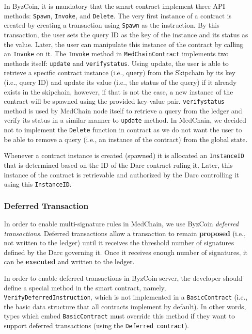 In ByzCoin, it is mandatory that the smart contract implement three API methods: \texttt{Spawn}, \texttt{Invoke}, and \texttt{Delete}. The very first instance of a contract is created by creating a transaction using \texttt{Spawn} as the instruction. By this transaction, the user sets the query ID as the key of the instance and its status as the value. Later, the user can manipulate this instance of the contract by calling an \texttt{Invoke} on it. The \texttt{Invoke} method in \texttt{MedChainContract} implements two methods itself: \texttt{update} and \texttt{verifystatus}. Using update, the user is able to retrieve a specific contract instance (i.e., query) from the Skipchain by its key (i.e., query ID) and update its value (i.e., the status of the query) if it already exists in the skipchain, however, if that is not the case, a new instance of the contract will be spawned using the provided key-value pair. \texttt{verifystatus} method is used by MedChain node itself to retrieve a query from the ledger and verify its status in a similar manner to \texttt{update} method. In MedChain, we decided not to implement the \texttt{Delete} function in contract as we do not want the user to be able to remove a query (i.e., an instance of the contract) from the global state. 

Whenever a contract instance is created (spawned) it is allocated an \texttt{InstanceID} that is determined based on the ID of the Darc contract ruling it. Later, this instance of the contract is retrievable and authorized by the Darc controlling it using this \texttt{InstanceID}.

\subsubsection{Deferred Transaction}
In order to enable multi-signature rules in MedChain, we use ByzCoin \textit{deferred transactions}. Deferred transactions allow a transaction to remain \textbf{proposed} (i.e., not written to the ledger) until it receives the threshold number of signatures defined by the Darc governing it. Once it receives enough number of signatures, it can be \textbf{executed} and written to the ledger. 

In order to enable deferred transactions in ByzCoin server, the developer should define a special method in the smart contract, namely, \texttt{VerifyDeferredInstruction}, which is not implemented in a \texttt{BasicContract} (i.e., the basic data structure that all contracts implement by default). In other words, types which embed \texttt{BasicContract} must override this method if they want to support deferred transactions (using the \texttt{Deferred contract}). 

